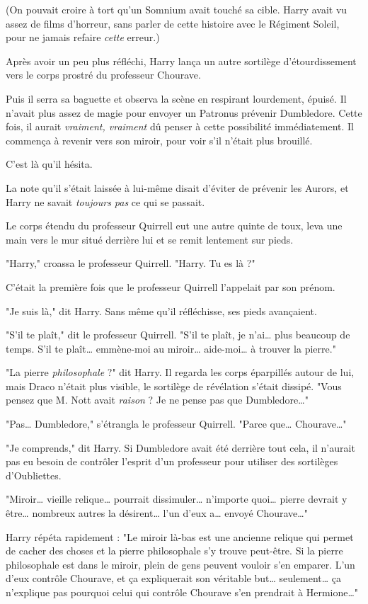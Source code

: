 (On pouvait croire à tort qu'un Somnium avait touché sa cible. Harry avait vu assez de films d'horreur, sans parler de cette histoire avec le Régiment Soleil, pour ne jamais refaire \emph{cette}  erreur.)

Après avoir un peu plus réfléchi, Harry lança un autre sortilège d'étourdissement vers le corps prostré du professeur Chourave.

Puis il serra sa baguette et observa la scène en respirant lourdement, épuisé. Il n'avait plus assez de magie pour envoyer un Patronus prévenir Dumbledore. Cette fois, il aurait \emph{vraiment, vraiment}  dû penser à cette possibilité immédiatement. Il commença à revenir vers son miroir, pour voir s'il n'était plus brouillé.

C'est là qu'il hésita.

La note qu'il s'était laissée à lui-même disait d'éviter de prévenir les Aurors, et Harry ne savait \emph{toujours pas}  ce qui se passait.

Le corps étendu du professeur Quirrell eut une autre quinte de toux, leva une main vers le mur situé derrière lui et se remit lentement sur pieds.

"Harry," croassa le professeur Quirrell. "Harry. Tu es là ?"

C'était la première fois que le professeur Quirrell l'appelait par son prénom.

"Je suis là," dit Harry. Sans même qu'il réfléchisse, ses pieds avançaient.

"S'il te plaît," dit le professeur Quirrell. "S'il te plaît, je n'ai… plus beaucoup de temps. S'il te plaît… emmène-moi au miroir… aide-moi… à trouver la pierre."

"La pierre \emph{philosophale}  ?" dit Harry. Il regarda les corps éparpillés autour de lui, mais Draco n'était plus visible, le sortilège de révélation s'était dissipé. "Vous pensez que M. Nott avait \emph{raison}  ? Je ne pense pas que Dumbledore…"

"Pas… Dumbledore," s'étrangla le professeur Quirrell. "Parce que… Chourave…"

"Je comprends," dit Harry. Si Dumbledore avait été derrière tout cela, il n'aurait pas eu besoin de contrôler l'esprit d'un professeur pour utiliser des sortilèges d'Oubliettes.

"Miroir… vieille relique… pourrait dissimuler… n'importe quoi… pierre devrait y être… nombreux autres la désirent… l'un d'eux a… envoyé Chourave…"

Harry répéta rapidement : "Le miroir là-bas est une ancienne relique qui permet de cacher des choses et la pierre philosophale s'y trouve peut-être. Si la pierre philosophale est dans le miroir, plein de gens peuvent vouloir s'en emparer. L'un d'eux contrôle Chourave, et ça expliquerait son véritable but… seulement… ça n'explique pas pourquoi celui qui contrôle Chourave s'en prendrait à Hermione…"


